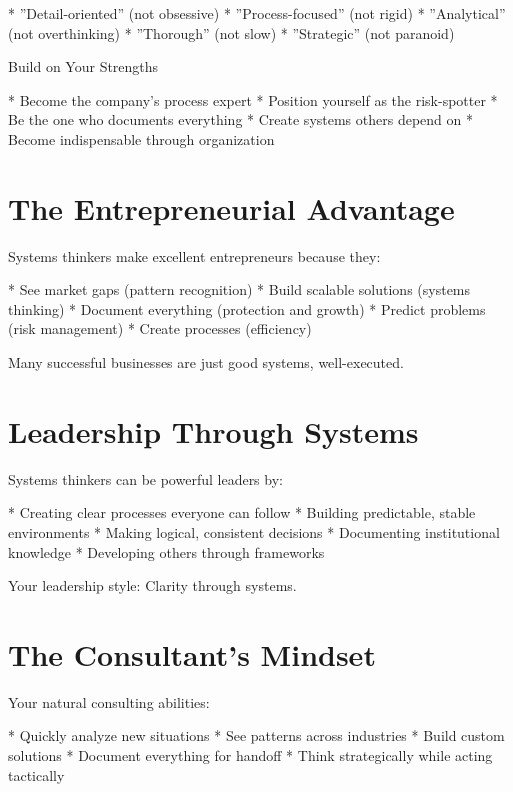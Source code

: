 \documentclass[12pt,oneside]{book}
\begin{document}
                    * ''Detail-oriented'' (not obsessive)
                    * ''Process-focused'' (not rigid)
                    * ''Analytical'' (not overthinking)
                    * ''Thorough'' (not slow)
                    * ''Strategic'' (not paranoid)

                Build on Your Strengths

                    * Become the company's process expert
                    * Position yourself as the risk-spotter
                    * Be the one who documents everything
                    * Create systems others depend on
                    * Become indispensable through organization

\section{The Entrepreneurial Advantage}

Systems thinkers make excellent entrepreneurs because they:

                    * See market gaps (pattern recognition)
                    * Build scalable solutions (systems thinking)
                    * Document everything (protection and growth)
                    * Predict problems (risk management)
                    * Create processes (efficiency)

Many successful businesses are just good systems, well-executed.

\section{Leadership Through Systems}

Systems thinkers can be powerful leaders by:

                    * Creating clear processes everyone can follow
                    * Building predictable, stable environments
                    * Making logical, consistent decisions
                    * Documenting institutional knowledge
                    * Developing others through frameworks

Your leadership style: Clarity through systems.

\section{The Consultant's Mindset}

Your natural consulting abilities:

                    * Quickly analyze new situations
                    * See patterns across industries
                    * Build custom solutions
                    * Document everything for handoff
                    * Think strategically while acting tactically
\end{document}
